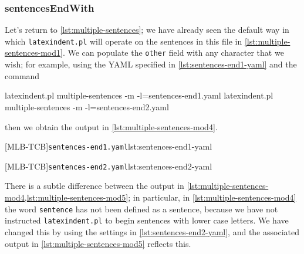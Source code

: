 \subsubsection{sentencesEndWith}
 \begin{example}
 Let's return to \vref{lst:multiple-sentences}; we have already seen the default way in
 which \texttt{latexindent.pl} will operate on the sentences in this file in
 \vref{lst:multiple-sentences-mod1}. We can populate the \texttt{other} field with any
 character that we wish; for example, using the YAML specified in
 \cref{lst:sentences-end1-yaml} and the command 
  

 \begin{commandshell}
latexindent.pl multiple-sentences -m -l=sentences-end1.yaml
latexindent.pl multiple-sentences -m -l=sentences-end2.yaml
\end{commandshell}

 then we obtain the output in \cref{lst:multiple-sentences-mod4}. 

 \begin{cmhtcbraster}
  [MLB-TCB]{\texttt{sentences-end1.yaml}}{lst:sentences-end1-yaml}
 \end{cmhtcbraster}

 \begin{cmhtcbraster}
  [MLB-TCB]{\texttt{sentences-end2.yaml}}{lst:sentences-end2-yaml}
 \end{cmhtcbraster}

 There is a subtle difference between the output in
 \cref{lst:multiple-sentences-mod4,lst:multiple-sentences-mod5}; in particular, in
 \cref{lst:multiple-sentences-mod4} the word \texttt{sentence} has not been defined as a
 sentence, because we have not instructed \texttt{latexindent.pl} to begin sentences with
 lower case letters. We have changed this by using the settings in
 \cref{lst:sentences-end2-yaml}, and the associated output in
 \cref{lst:multiple-sentences-mod5} reflects this.
 \end{example}

